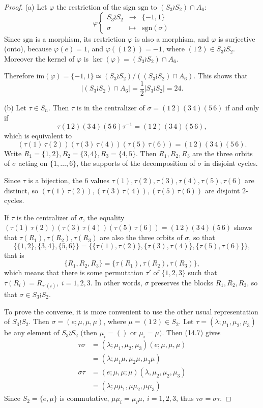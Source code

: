 \documentclass[11pt,a4paper]{article}
\begin{document}
\begin{proof}
\item[(a)] Let $\varphi$ the restriction of the sign $\mathrm{sgn}$ to $(S_3 \wr S_2) \cap A_6$:
$$
\varphi \left\{
\begin{array}{ccc}
S_3 \wr S_2 & \to & \{-1,1\}\\
\sigma & \mapsto & \mathrm{sgn}(\sigma)
\end{array}
\right.
$$
Since $\mathrm{sgn}$ is a morphism, its restriction $\varphi$ is also a morphism, and $\varphi$ is surjective (onto), because $\varphi(e) = 1$, and $\varphi((1\,2)) = -1$, where $(1\,2) \in S_3\wr S_2$. Moreover the kernel of $\varphi$ is $\ker(\varphi) =  (S_3 \wr S_2) \cap A_6$.

Therefore $\mathrm{im}(\varphi) =  \{-1,1\} \simeq (S_3 \wr S_2)/ ((S_3 \wr S_2) \cap A_6)$. This shows that $$|(S_3 \wr S_2) \cap A_6| = \frac{1}{2} |S_3 \wr S_2| = 24.$$

\item[(b)] Let $\tau \in S_n$. Then $\tau$ is in the centralizer of $\sigma = (1\,2)(3\,4)(5\,6)$ if and only if
$$\tau (1\,2)(3\,4)(5\,6) \tau^{-1} = (1\,2)(3\,4)(5\,6),$$
which is equivalent to
$$(\tau(1)\, \tau(2))(\tau(3)\, \tau(4))(\tau(5)\, \tau(6)) = (1\,2)(3\,4)(5\,6).$$
Write $R_1 = \{1,2\}, R_2 = \{3,4\},R_3 = \{4,5\}$. Then $R_1, R_2,R_3$ are the three orbits  of $\sigma$ acting on $\{1,\ldots,6\}$, the supports of the decomposition of $\sigma$ in disjoint cycles.

Since $\tau$ is a bijection, the 6 values $\tau(1),\tau(2),\tau(3), \tau(4),\tau(5), \tau(6)$ are distinct, so $(\tau(1)\, \tau(2)),(\tau(3)\, \tau(4)),(\tau(5)\, \tau(6))$ are disjoint $2$-cycles. 

If $\tau$ is the centralizer of $\sigma$, the equality $(\tau(1)\, \tau(2))(\tau(3)\, \tau(4))(\tau(5)\, \tau(6)) = (1\,2)(3\,4)(5\,6)$ shows that $\tau(R_1),\tau(R_2),\tau(R_3)$ are also the three orbits of $\sigma$, so that
$$\{\{1,2\},\{3,4\},\{5,6\}\} =\{\{ \tau(1), \tau(2)\},\{\tau(3), \tau(4)\},\{\tau(5), \tau(6)\}\},$$
that is
$$\{R_1,R_2,R_3\} = \{\tau(R_1),\tau(R_2),\tau(R_3)\},$$
which means that there is some permutation $\tau'$ of $\{1,2,3\}$ such that $\tau(R_i) = R_{\tau'(i)}, \ i=1,2,3$. In other words, $\sigma$ preserves the blocks $R_1,R_2,R_3$, so that $\sigma \in S_3 \wr S_2$.

To prove the converse, it is more convenient to use the other usual representation of $S_3\wr S_2$. Then $\sigma = (e; \mu,\mu,\mu)$, where $\mu = (1\, 2) \in S_2$. Let $\tau = (\lambda; \mu_1,\mu_2,\mu_3)$ be any element of $S_3 \wr S_2$ (then $\mu_i = ()$ or $\mu_i = \mu)$. Then (14.7) gives
\begin{align*}
\tau \sigma &= (\lambda; \mu_1,\mu_2,\mu_3)(e; \mu,\mu,\mu)\\
&=(\lambda;\mu_1\mu, \mu_2 \mu,\mu_3\mu)\\
\sigma \tau &= (e;\mu,\mu;\mu)(\lambda,\mu_2,\mu_2,\mu_3)\\
&= (\lambda; \mu \mu_1, \mu \mu_2,\mu \mu_3)
\end{align*}
Since $S_2 = \{e,\mu\}$ is commutative, $\mu \mu_i = \mu_i \mu,\ i=1,2,3$, thus $\tau \sigma = \sigma \tau$.


\end{proof}
\end{document}
